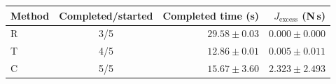 \begin{tabular}{lcrr}
\toprule
Method & Completed/started & Completed time (s) & $J_{\mathrm{excess}}$ (N\,s) \\
\midrule
R & 3/5 & $29.58 \pm 0.03$ & $0.000 \pm 0.000$ \\
T & 4/5 & $12.86 \pm 0.01$ & $0.005 \pm 0.011$ \\
C & 5/5 & $15.67 \pm 3.60$ & $2.323 \pm 2.493$ \\
\bottomrule
\end{tabular}
